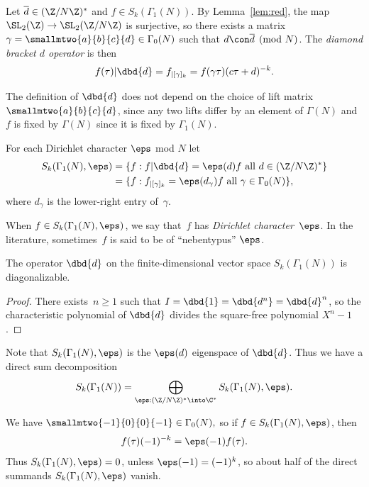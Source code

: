 \documentclass{report}
\begin{document}
\begin{definition}
Let $\overline{d}\in(\Z/N\Z)^{*}$ and $f\in S_k(\Gamma_1(N))$.
By Lemma~\ref{lem:red}, the map $\SL_2(\Z)\to\SL_2(\Z/N\Z)$ is surjective,  so there exists a matrix
$\gamma=\smallmtwo{a}{b}{c}{d}
        \in\Gamma_0(N)$
such that $d\con\overline{d}\pmod{N}$. The {\em
diamond bracket $d$ operator} is then
\[
 f(\tau)|\dbd{d} = f_{|[\gamma]_k} =  f(\gamma\tau)(c\tau+d)^{-k}.
\]
\end{definition}


The definition of $\dbd{d}$ does not depend on the choice of lift matrix
$\smallmtwo{a}{b}{c}{d}$, since any two lifts differ by an element of
$\Gamma(N)$ and $f$ is fixed by $\Gamma(N)$ since it is fixed by $\Gamma_1(N)$.

For each Dirichlet character $\eps$ mod $N$ let
\begin{align*}
  S_k(\Gamma_1(N),\eps) &=
          \{ f : f|\dbd{d} =
         \eps(d) f
             \text{ all } d\in(\Z/N\Z)^* \}\\
&=
        \{ f : f_{|[\gamma]_k} = \eps(d_\gamma) f
             \text{ all } \gamma  \in \Gamma_0(N) \},
\end{align*}
where $d_\gamma$ is the lower-right entry of~$\gamma$.

When $f\in{}S_k(\Gamma_1(N),\eps)$, we say that~$f$
has {\em Dirichlet character}~$\eps$.  In the literature, sometimes~$f$ is said to
be of ``nebentypus'' $\eps$.

\begin{lemma}
 The operator $\dbd{d}$ on the finite-dimensional vector
space $S_k(\Gamma_1(N))$ is diagonalizable.
\end{lemma}
\begin{proof}
There exists~$n\geq 1$ such that $I=\dbd{1}=\dbd{d^n}=\dbd{d}^n$, so the
characteristic polynomial of $\dbd{d}$ divides the square-free
polynomial $X^n-1$.
\end{proof}
Note that $S_k(\Gamma_1(N),\eps)$ is the $\eps(d)$ eigenspace of $\dbd{d}$.
Thus we have a direct sum decomposition
\[
S_k(\Gamma_1(N))=\bigoplus_{\eps:(\Z/N\Z)^{*}\into\C^{*}}
                             S_k(\Gamma_1(N),\eps).
\]

We have
 $\smallmtwo{-1}{\hfill 0}{\hfill 0}{-1}\in\Gamma_0(N),$
so if $f\in{}S_k(\Gamma_1(N),\eps)$, then
$$f(\tau)(-1)^{-k}=\eps(-1)f(\tau).$$
Thus $S_k(\Gamma_1(N),\eps)=0$, unless $\eps(-1)=(-1)^{k}$,
so about half of the direct summands $S_k(\Gamma_1(N),\eps)$
vanish.
\end{document}

